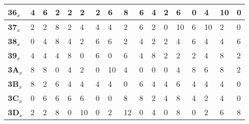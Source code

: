 \begin{longtable}[c]{|l|l|l|l|l|l|l|l|l|l|l|l|l|l|l|l|l|}
\textbf{36$_x$} & 4              & 6              & 2              & 2              & 2              & 2              & 6              & 8              & 6              & 4              & 2              & 6              & 0              & 4              & 10             & 0              \\ \hline
\textbf{37$_x$} & 2              & 2              & 8              & 2              & 4              & 4              & 4              & 2              & 6              & 2              & 0              & 10             & 6              & 10             & 2              & 0              \\ \hline
\textbf{38$_x$} & 0              & 4              & 8              & 4              & 2              & 6              & 6              & 2              & 4              & 2              & 2              & 4              & 6              & 4              & 4              & 6              \\ \hline
\textbf{39$_x$} & 4              & 4              & 4              & 8              & 0              & 6              & 0              & 6              & 4              & 8              & 2              & 2              & 2              & 4              & 8              & 2              \\ \hline
\textbf{3A$_x$} & 8              & 8              & 0              & 4              & 2              & 0              & 10             & 4              & 0              & 0              & 0              & 4              & 8              & 6              & 8              & 2              \\ \hline
\textbf{3B$_x$} & 8              & 2              & 6              & 4              & 4              & 4              & 4              & 0              & 6              & 4              & 4              & 6              & 4              & 4              & 4              & 0              \\ \hline
\textbf{3C$_x$} & 0              & 6              & 6              & 6              & 6              & 0              & 0              & 8              & 8              & 2              & 4              & 8              & 4              & 2              & 4              & 0              \\ \hline
\textbf{3D$_x$} & 2              & 2              & 8              & 0              & 10             & 0              & 2              & 12             & 0              & 4              & 0              & 8              & 0              & 2              & 6              & 8              \\ \hline

\end{longtable}
